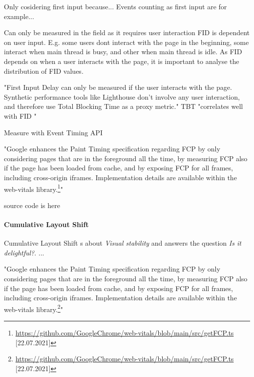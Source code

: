 Only cosidering first input because...
Events counting as first input are for example...




Can only be measured in the field as it requires user interaction
FID is dependent on user input.
E.g. some users dont interact with the page in the beginning, some interact when main thread is busy, and other when main thread is idle.
As FID depends on when a user interacts with the page, it is important to analyse the distribution of FID values.



"First Input Delay can only be measured if the user interacts with the page. Synthetic performance tools like Lighthouse don't involve any user interaction, and therefore use Total Blocking Time as a proxy metric."
TBT "correlates well with FID "



Measure with Event Timing API

"Google enhances the Paint Timing specification regarding FCP by only considering pages that are in the foreground all the time,
by measuring FCP also if the page has been loaded from cache, and by exposing FCP for all frames, including cross-origin iframes.
Implementation details are available within the web-vitals library.\footnote{\url{https://github.com/GoogleChrome/web-vitals/blob/main/src/getFCP.ts} [22.07.2021]}"


source code is here %








\paragraph{Cumulative Layout Shift}


Cumulative Layout Shift s about \textit{Visual stability} and answers the question \textit{Is it delightful?}.
...




"Google enhances the Paint Timing specification regarding FCP by only considering pages that are in the foreground all the time,
by measuring FCP also if the page has been loaded from cache, and by exposing FCP for all frames, including cross-origin iframes.
Implementation details are available within the web-vitals library.\footnote{\url{https://github.com/GoogleChrome/web-vitals/blob/main/src/getFCP.ts} [22.07.2021]}"

